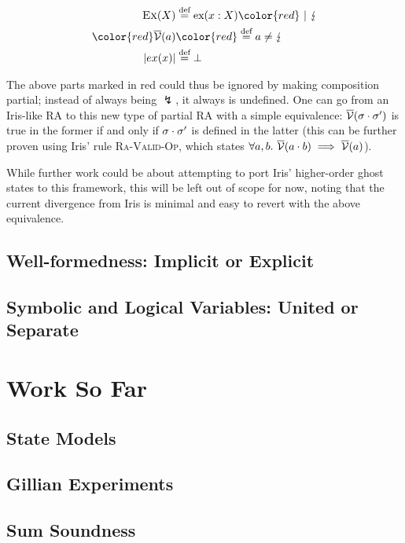 \begin{align*}
	\textsc{Ex}(X) &\defeq \text{ex}(x:X) \color{red} ~|~ \lightning\\
	\color{red}\irisval(a) &\color{red}\defeq a \neq \lightning\\
	|ex(x)| &\defeq \bot
\end{align*}

The above parts marked in {\color{red}red} could thus be ignored by making composition partial; instead of always being $\lightning$, it always is undefined. One can go from an Iris-like RA to this new type of partial RA with a simple equivalence: $\overline{\cal V}(\sigma\cdot\sigma')$ is true in the former if and only if $\sigma\cdot\sigma'$ is defined in the latter (this can be further proven using Iris' rule \textsc{Ra-Valid-Op}, which states $\forall a,b.~ \overline{\cal V}(a\cdot b)\implies \overline{\cal V}(a)$).

While further work could be about attempting to port Iris' higher-order ghost states to this framework, this will be left out of scope for now, noting that the current divergence from Iris is minimal and easy to revert with the above equivalence.

\subsection{Well-formedness: Implicit or Explicit}

\subsection{Symbolic and Logical Variables: United or Separate}

\section{Work So Far}

\subsection{State Models}

\subsection{Gillian Experiments}

\subsection{Sum Soundness}













